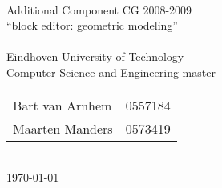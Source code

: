 \begin{titlepage}
	\begin{center}
		~\\
		\vspace{100pt}
		\Huge{Additional Component CG 2008-2009}\\
		\vspace{50pt}
		\huge
		``block editor: geometric modeling''\\
		\doctitle\\
		\vspace{100pt}
		\large
		Eindhoven University of Technology\\
		Computer Science and Engineering master\\
		\vspace{50pt}
		\begin{tabular}{ll}
			Bart van Arnhem & 0557184 \\
			Maarten Manders & 0573419 \\
		\end{tabular}\\
		\vspace{50pt}
		\today
	\end{center}
\end{titlepage}